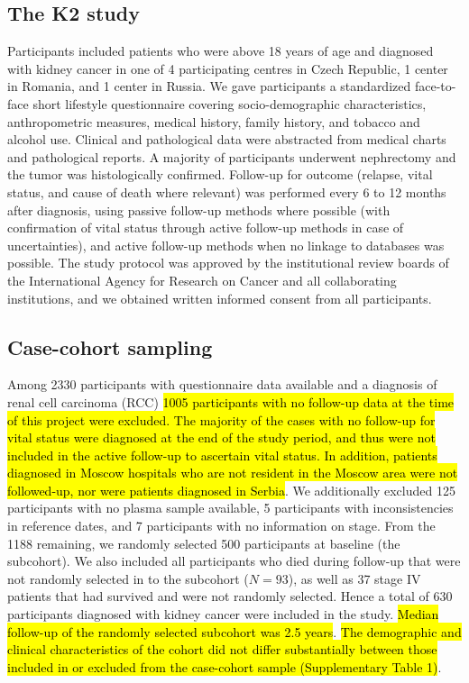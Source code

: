 \documentclass[a4paper,11pt]{article}
\begin{document}
\subsection*{The K2 study}
Participants included patients who were above 18 years of age and diagnosed 
with kidney cancer in one of 4 participating centres in Czech Republic, 1 
center in Romania, and 1 center in Russia. We gave 
participants a standardized face-to-face short lifestyle 
questionnaire covering socio-demographic characteristics, anthropometric 
measures, medical history, family history, and tobacco and alcohol use. 
Clinical and pathological data were abstracted from medical charts and 
pathological reports. A majority of participants underwent nephrectomy and the 
tumor was histologically confirmed. Follow-up for outcome (relapse, vital 
status, and cause of death where relevant) was performed every 6 to 12 months 
after diagnosis, using passive follow-up methods where possible (with 
confirmation of vital status through active follow-up methods in case of 
uncertainties), and active follow-up methods when no linkage to databases was 
possible. The study protocol was approved by the institutional review boards of the 
International Agency for Research on Cancer and all collaborating institutions, and 
we obtained written informed consent from all participants. 

\subsection*{Case-cohort sampling}
Among 2330 participants with questionnaire data available and a diagnosis of 
renal cell carcinoma (RCC) \hl{1005 participants with no follow-up data at 
the time of this project were excluded. The majority of the cases with no follow-up 
for vital status were diagnosed at the end of the study period, and thus were not 
included in the active follow-up to ascertain vital status. In addition, patients 
diagnosed in Moscow hospitals who are not resident in the Moscow area were not 
followed-up, nor were patients diagnosed in Serbia}. We additionally excluded 125 
participants with no plasma sample available, 5 participants with inconsistencies in 
reference dates, and 7 participants with no information on stage. From the 1188 
remaining, we randomly selected 500 participants at baseline (the subcohort). We also 
included all participants who died during follow-up that were not randomly selected 
in to the subcohort ($N=93$), as well as 37 stage IV patients that had survived and 
were not randomly selected. Hence a total of 630 participants diagnosed with kidney 
cancer were included in the study. \hl{Median follow-up of the randomly selected 
subcohort was 2.5 years}. \hl{The demographic and clinical characteristics of the 
cohort did not differ substantially between those included in or excluded from the 
case-cohort sample (Supplementary Table 1)}.
\end{document}
